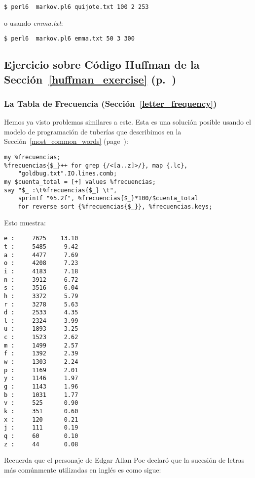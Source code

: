 \begin{verbatim}
$ perl6  markov.pl6 quijote.txt 100 2 253
\end{verbatim}

o usando \emph{emma.txt}:
\begin{verbatim}
$ perl6  markov.pl6 emma.txt 50 3 300
\end{verbatim}

\subsection{Ejercicio sobre Código Huffman de la Sección~\ref{huffman_exercise} (p.~\pageref{huffman_exercise})}

\subsubsection{La Tabla de Frecuencia (Sección~\ref{letter_frequency})}
\label{sol_letter_frequency}

Hemos ya visto problemas similares a este. Esta es una solución
posible usando el modelo de programación de tuberías que describimos
en la Sección~\ref{most_common_words} (page~\pageref{most_common_words}):

\begin{verbatim}
my %frecuencias;
%frecuencias{$_}++ for grep {/<[a..z]>/}, map {.lc}, 
    "goldbug.txt".IO.lines.comb;
my $cuenta_total = [+] values %frecuencias;
say "$_ :\t%frecuencias{$_} \t", 
    sprintf "%5.2f", %frecuencias{$_}*100/$cuenta_total 
    for reverse sort {%frecuencias{$_}}, %frecuencias.keys;
\end{verbatim}   

Esto muestra:
\begin{verbatim}
e :     7625    13.10
t :     5485     9.42
a :     4477     7.69
o :     4208     7.23
i :     4183     7.18
n :     3912     6.72
s :     3516     6.04
h :     3372     5.79
r :     3278     5.63
d :     2533     4.35
l :     2324     3.99
u :     1893     3.25
c :     1523     2.62
m :     1499     2.57
f :     1392     2.39
w :     1303     2.24
p :     1169     2.01
y :     1146     1.97
g :     1143     1.96
b :     1031     1.77
v :     525      0.90
k :     351      0.60
x :     120      0.21
j :     111      0.19
q :     60       0.10
z :     44       0.08
\end{verbatim}

Recuerda que el personaje de Edgar Allan Poe declaró que la
sucesión de letras más comúnmente utilizadas en inglés es 
como sigue:

